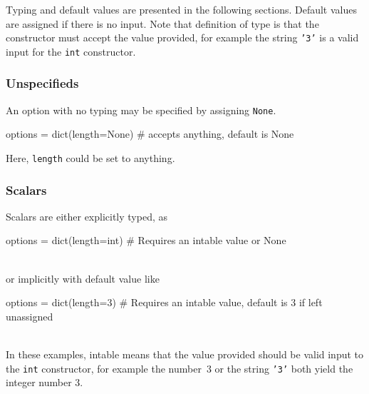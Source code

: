Typing and default values are presented in the following sections.
Default values are assigned if there is no input.  Note that
definition of type is that the constructor must accept the value
provided, for example the string \texttt{'3'} is a valid input for the
\texttt{int} constructor.


\subsubsection{Unspecifieds}
An option with no typing may be specified by assigning \texttt{None}.
\\
\begin{python}
  options = dict(length=None)
  # accepts anything, default is None
\end{python}
Here, \texttt{length} could be set to anything.



\subsubsection*{Scalars}
Scalars are either explicitly typed, as
\\
\begin{python}
  options = dict(length=int)
  # Requires an intable value or None
\end{python}
\\
or implicitly with default value like

\begin{python}
  options = dict(length=3)
  # Requires an intable value, default is 3 if left unassigned
\end{python}
\\
In these examples, intable means that the value provided should be
valid input to the \texttt{int} constructor, for example the number~3
or the string \texttt{'3'} both yield the integer number 3.



